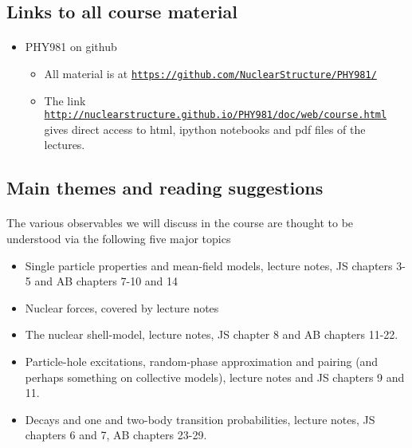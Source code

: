 \documentclass[%
oneside,                 %
final,                   %
10pt]{article}
\begin{document}
\subsection*{Links to all course material}

\paragraph{}
\begin{itemize}
\item PHY981 on github
\begin{itemize}

 \item All material is at  \href{{https://github.com/NuclearStructure/PHY981/}}{\nolinkurl{https://github.com/NuclearStructure/PHY981/}}

 \item The link \href{{http://nuclearstructure.github.io/PHY981/doc/web/course.html}}{\nolinkurl{http://nuclearstructure.github.io/PHY981/doc/web/course.html}} gives direct access to html, ipython notebooks and pdf files of the lectures.
\end{itemize}

\noindent
\end{itemize}

\noindent





\subsection*{Main themes and reading suggestions}

\paragraph{}
The various observables we will discuss in the course are thought to be understood via the following five 
major topics
\begin{itemize}
\item Single  particle properties and mean-field models, lecture notes, JS chapters 3-5 and AB chapters 7-10 and 14

\item Nuclear forces, covered by lecture notes

\item The nuclear shell-model, lecture notes, JS chapter 8 and AB chapters 11-22.

\item Particle-hole excitations, random-phase approximation and pairing (and perhaps something on collective models), lecture notes and JS chapters 9 and 11.

\item Decays and one and two-body transition probabilities, lecture notes, JS chapters 6 and 7, AB chapters 23-29.
\end{itemize}
\end{document}
